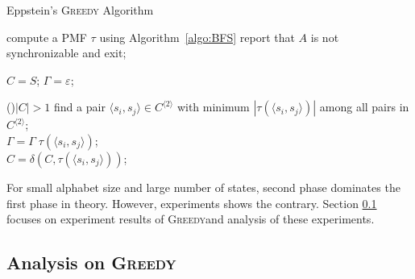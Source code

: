 \documentclass[12pt]{article}
\newcommand{\comment}[2]{{\color{red}{\bf (#1: #2)}}}
\newcommand{\greedyAlgo}{\textsc{Greedy}}
\begin{document}
\renewcommand{\baselinestretch}{0.9}
\begin{algorithm}
	\label{algo:greedy}
	\caption{Eppstein's \textsc{Greedy} Algorithm}
	
	
	compute a PMF $\tau$ using Algorithm~\ref{algo:BFS}\;
	{
		report that $A$ is not synchronizable and exit;	
	}

	
	$C = S$; 
	$\Gamma = \varepsilon$; 
	
	\While(){$|C| > 1$}
	{
		find a pair $\langle s_i,s_j \rangle \in C^{\langle 2 \rangle}$ 
		with minimum $|\tau(\langle s_i,s_j \rangle)|$ among all pairs 
		in $C^{\langle 2 \rangle}$;\\
		
		
		$\Gamma = \Gamma \; \tau(\langle s_i,s_j \rangle)$;\\
		$C = \delta(C,\tau(\langle s_i,s_j \rangle))$;
	}
\end{algorithm}
\renewcommand{\baselinestretch}{1}

For small alphabet size and large number of states, second phase dominates the first phase in theory. However, experiments shows the contrary. Section \ref{sec:greedy-analysis} focuses on experiment results of \greedyAlgo and analysis of these experiments. \comment{sertac}{Biraz informal oldu sanki ama emin de olamadim}


\subsection{Analysis on \greedyAlgo}
\label{sec:greedy-analysis}

\newpage


\end{document}
